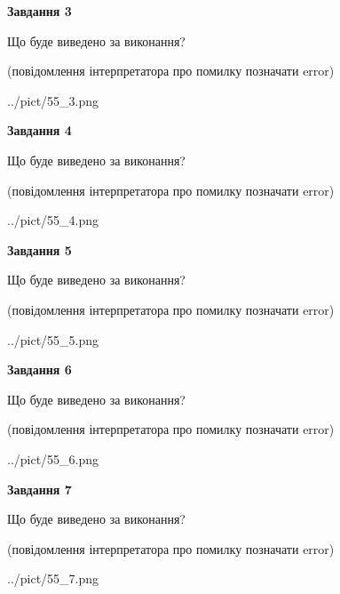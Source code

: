 \documentclass[12pt, ukrainian]{article}
\begin{document}
{\begin {large}
{\begin {center}\textbf{Завдання 3}\end {center}}\par
Що буде виведено за виконання?\par
 (повідомлення інтерпретатора про помилку позначати error)\par
\begin{center}
	{../pict/55_3.png}
\end{center}
\newpage

{\begin {center}\textbf{Завдання 4}\end {center}}\par
Що буде виведено за виконання?\par
 (повідомлення інтерпретатора про помилку позначати error)\par
\begin{center}
	{../pict/55_4.png}
\end{center}
\newpage

{\begin {center}\textbf{Завдання 5}\end {center}}\par
Що буде виведено за виконання?\par
 (повідомлення інтерпретатора про помилку позначати error)\par
\begin{center}
	{../pict/55_5.png}
\end{center}
\newpage

{\begin {center}\textbf{Завдання 6}\end {center}}\par
Що буде виведено за виконання?\par
 (повідомлення інтерпретатора про помилку позначати error)\par
\begin{center}
	{../pict/55_6.png}
\end{center}
\newpage

{\begin {center}\textbf{Завдання 7}\end {center}}\par
Що буде виведено за виконання?\par
 (повідомлення інтерпретатора про помилку позначати error)\par
\begin{center}
	{../pict/55_7.png}
\end{center}
\newpage


\end{large}}
\end{document}
